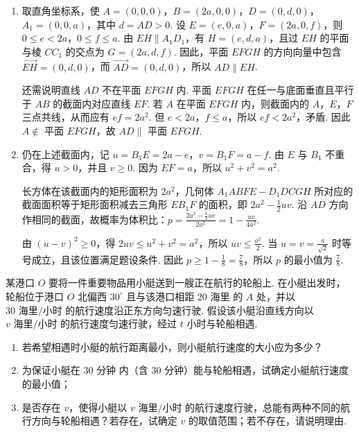 \begin{solution}
\begin{enumerate}
\item 取直角坐标系，使 \(A=(0,0,0)\)，\(B=(2a,0,0)\)，\(D=(0,d,0)\)，\(A_1=(0,0,a)\)，其中 \(d=AD>0\). 设 \(E=(e,0,a)\)，\(F=(2a,0,f)\)，则 \(0\leqslant e<2a\)，\(0\leqslant f\leqslant a\). 由 \(EH\parallel A_1D_1\)，有 \(H=(e,d,a)\)，且过 \(EH\) 的平面与棱 \(CC_1\) 的交点为 \(G=(2a,d,f)\). 因此，平面 \(EFGH\) 的方向向量中包含 \(\overrightarrow{EH}=(0,d,0)\)，而 \(\overrightarrow{AD}=(0,d,0)\)，所以 \(AD\parallel EH\).

还需说明直线 \(AD\) 不在平面 \(EFGH\) 内. 平面 \(EFGH\) 在任一与底面垂直且平行于 \(AB\) 的截面内对应直线 \(EF\). 若 \(A\) 在平面 \(EFGH\) 内，则截面内的 \(A\)，\(E\)，\(F\) 三点共线，从而应有 \(ef=2a^2\). 但 \(e<2a\)，\(f\leqslant a\)，所以 \(ef<2a^2\)，矛盾. 因此 \(A\notin\) 平面 \(EFGH\)，故 \(AD\parallel\) 平面 \(EFGH\).
\item 仍在上述截面内，记 \(u=B_1E=2a-e\)，\(v=B_1F=a-f\). 由 \(E\) 与 \(B_1\) 不重合，得 \(u>0\)，并且 \(v\geqslant0\). 因为 \(EF=a\)，所以 \(u^2+v^2=a^2\).

长方体在该截面内的矩形面积为 \(2a^2\)，几何体 \(A_1ABFE-D_1DCGH\) 所对应的截面面积等于矩形面积减去三角形 \(EB_1F\) 的面积，即 \(2a^2-\frac{1}{2}uv\). 沿 \(AD\) 方向作相同的截面，故概率为体积比：\(p=\frac{2a^2-\frac{1}{2}uv}{2a^2}=1-\frac{uv}{4a^2}\).

由 \((u-v)^2\geqslant0\)，得 \(2uv\leqslant u^2+v^2=a^2\)，所以 \(uv\leqslant\frac{a^2}{2}\). 当 \(u=v=\frac{a}{\sqrt{2}}\) 时等号成立，且该位置满足题设条件. 因此 \(p\geqslant1-\frac{1}{8}=\frac{7}{8}\)，所以 \(p\) 的最小值为 \(\frac{7}{8}\).
\end{enumerate}
\end{solution}

\begin{problem}
某港口 \(O\) 要将一件重要物品用小艇送到一艘正在航行的轮船上. 在小艇出发时，轮船位于港口 \(O\) 北偏西 \(30^{\circ}\) 且与该港口相距 \(20\text{ 海里}\) 的 \(A\) 处，并以 \(30\text{ 海里/小时}\) 的航行速度沿正东方向匀速行驶. 假设该小艇沿直线方向以 \(v\text{ 海里/小时}\) 的航行速度匀速行驶，经过 \(t\) 小时与轮船相遇.

\begin{enumerate}
\item 若希望相遇时小艇的航行距离最小，则小艇航行速度的大小应为多少？
\item 为保证小艇在 \(30\text{ 分钟}\) 内（含 \(30\text{ 分钟}\)）能与轮船相遇，试确定小艇航行速度的最小值；
\item 是否存在 \(v\)，使得小艇以 \(v\text{ 海里/小时}\) 的航行速度行驶，总能有两种不同的航行方向与轮船相遇？若存在，试确定 \(v\) 的取值范围；若不存在，请说明理由.
\end{enumerate}
\end{problem}

